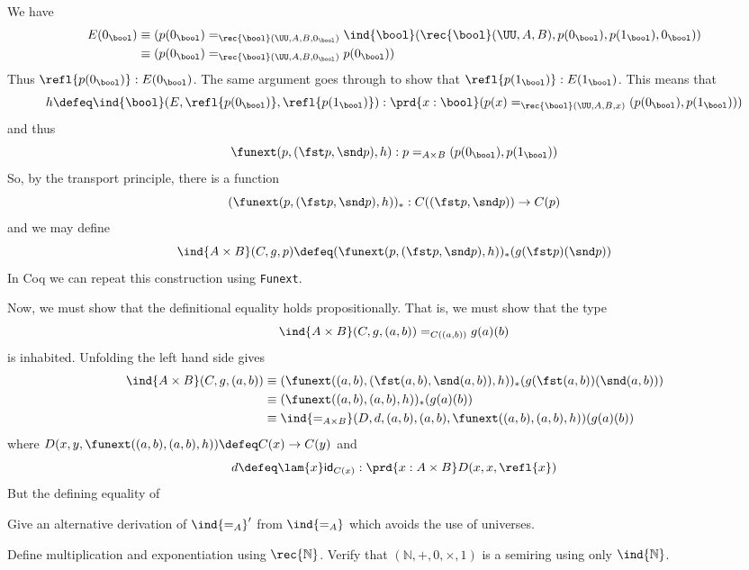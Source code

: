 We have
\begin{align*}
  E(0_{\bool})
  &\equiv
  (p(0_{\bool}) =_{\rec{\bool}(\UU, A, B, 0_{\bool})} \ind{\bool}(\rec{\bool}(\UU, A, B),
  p(0_{\bool}), p(1_{\bool}), 0_{\bool}))
  \\&\equiv
  (p(0_{\bool}) =_{\rec{\bool}(\UU, A, B, 0_{\bool})} p(0_{\bool}))
\end{align*}
Thus $\refl{p(0_{\bool})} : E(0_{\bool})$.  The same argument goes through to
show that $\refl{p(1_{\bool})} : E(1_{\bool})$.  This means that
\[
  h \defeq
  \ind{\bool}(E, \refl{p(0_{\bool})}, \refl{p(1_{\bool})})
  :
  \prd{x : \bool} (p(x) =_{\rec{\bool}(\UU, A, B, x)} (p(0_{\bool}),
  p(1_{\bool})))
\]
and thus
\[
  \funext(p, (\fst p, \snd p), h) 
  : p =_{A \times B} (p(0_{\bool}),
  p(1_{\bool}))
\]
So, by the transport principle, there is a function
\[
  (\funext(p, (\fst p, \snd p), h))_{*} : C((\fst p, \snd p)) \to C(p)
\]
and we may define
\[
  \ind{A \times B}(C, g, p) \defeq
  (\funext(p, (\fst p, \snd p), h))_{*}(g(\fst p)(\snd p))
\]
In Coq we can repeat this construction using \lstinline|Funext|.

Now, we must show that the definitional equality holds propositionally.  That
is, we must show that the type
\[
  \ind{A \times B}(C, g, (a, b)) =_{C((a, b))} g(a)(b)
\]
is inhabited.  Unfolding the left hand side gives
\begin{align*}
  \ind{A \times B}(C, g, (a, b))
  &\equiv
  (\funext((a, b), (\fst (a, b), \snd (a, b)), h))_{*}(g(\fst (a, b))(\snd (a, b)))
  \\&\equiv
  (\funext((a, b), (a, b), h))_{*}(g(a)(b))
  \\&\equiv
  \ind{=_{A\times B}}(D, d, (a, b), (a, b), \funext((a, b), (a, b), h))
  (g(a)(b))
\end{align*}
where $D(x, y, \funext((a, b), (a, b), h)) \defeq C(x) \to C(y)$ and
\[
  d \defeq \lam{x}\mathsf{id}_{C(x)} : \prd{x : A \times B}D(x, x, \refl{x})
\]
But the defining equality of 




 Give an alternative derivation of $\ind{=_{A}}'$ from
$\ind{=_{A}}$ which avoids the use of universes.

  Define multiplication and exponentiation using
$\rec{\mathbb{N}}$.  Verify that $(\mathbb{N}, +, 0, \times, 1)$ is a semiring
using only $\ind{\mathbb{N}}$.

